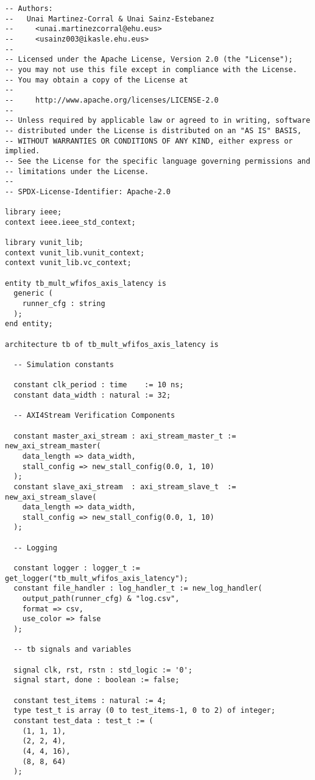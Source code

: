 \begin{code}
\begin{verbatim}
-- Authors:
--   Unai Martinez-Corral & Unai Sainz-Estebanez
--     <unai.martinezcorral@ehu.eus>
--     <usainz003@ikasle.ehu.eus>
--
-- Licensed under the Apache License, Version 2.0 (the "License");
-- you may not use this file except in compliance with the License.
-- You may obtain a copy of the License at
--
--     http://www.apache.org/licenses/LICENSE-2.0
--
-- Unless required by applicable law or agreed to in writing, software
-- distributed under the License is distributed on an "AS IS" BASIS,
-- WITHOUT WARRANTIES OR CONDITIONS OF ANY KIND, either express or implied.
-- See the License for the specific language governing permissions and
-- limitations under the License.
--
-- SPDX-License-Identifier: Apache-2.0

library ieee;
context ieee.ieee_std_context;

library vunit_lib;
context vunit_lib.vunit_context;
context vunit_lib.vc_context;

entity tb_mult_wfifos_axis_latency is
  generic (
    runner_cfg : string
  );
end entity;

architecture tb of tb_mult_wfifos_axis_latency is

  -- Simulation constants

  constant clk_period : time    := 10 ns;
  constant data_width : natural := 32;

  -- AXI4Stream Verification Components

  constant master_axi_stream : axi_stream_master_t := new_axi_stream_master(
    data_length => data_width,
    stall_config => new_stall_config(0.0, 1, 10)
  );
  constant slave_axi_stream  : axi_stream_slave_t  := new_axi_stream_slave(
    data_length => data_width,
    stall_config => new_stall_config(0.0, 1, 10)
  );

  -- Logging

  constant logger : logger_t := get_logger("tb_mult_wfifos_axis_latency");
  constant file_handler : log_handler_t := new_log_handler(
    output_path(runner_cfg) & "log.csv",
    format => csv,
    use_color => false
  );

  -- tb signals and variables

  signal clk, rst, rstn : std_logic := '0';
  signal start, done : boolean := false;

  constant test_items : natural := 4;
  type test_t is array (0 to test_items-1, 0 to 2) of integer;
  constant test_data : test_t := (
    (1, 1, 1),
    (2, 2, 4),
    (4, 4, 16),
    (8, 8, 64)
  );


\end{verbatim}
\end{code}
